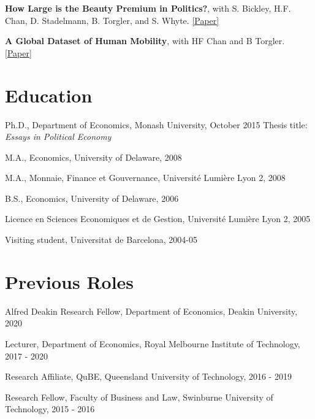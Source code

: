 \documentclass[letterpaper]{article}
\renewenvironment{itemize}{
  \begin{list}{}{
    \setlength{\leftmargin}{1.5em}
  }
}{
  \end{list}
}
\begin{document}
\begin{itemize}
	\item \textbf{How Large is the Beauty Premium in Politics?}, with S. Bickley, H.F. Chan, D. Stadelmann, B. Torgler, and S. Whyte.  \href{https://papers.ssrn.com/sol3/papers.cfm?abstract_id=4273311}{[Paper]}
 
				\medskip

	

\item \textbf{A Global Dataset of Human Mobility}, with HF Chan and B Torgler. \href{https://drive.google.com/file/d/1\_0UwLGb5UwmHztSybZu\_1er8125UCmy0/view}{[Paper]}	


 
\end{itemize}


\section*{Education}

\begin{itemize}
	\item Ph.D., Department of Economics, Monash University, October 2015
	\subitem Thesis title: {\emph{Essays in Political Economy}}
	\item M.A., Economics, University of Delaware, 2008 
	\item M.A., Monnaie, Finance et Gouvernance, Universit\'e Lumi\`ere Lyon 2, 2008
	\item B.S., Economics, University of Delaware, 2006
	\item Licence en Sciences Economiques et de Gestion, Universit\'e Lumi\`ere Lyon 2, 2005
	\item Visiting student, Universitat de Barcelona, 2004-05
\end{itemize}

\section*{ Previous Roles}

\begin{itemize}
	
	\item Alfred Deakin Research Fellow, Department of Economics, Deakin University, 2020
	
	\item Lecturer, Department of Economics, Royal Melbourne Institute of Technology, 2017 - 2020
	
	\item Research Affiliate, QuBE, Queensland University of Technology, 2016 - 2019
	
	\item Research Fellow, Faculty of Business and Law, Swinburne University of Technology, 2015 - 2016
	
\end{itemize}
\end{document}
